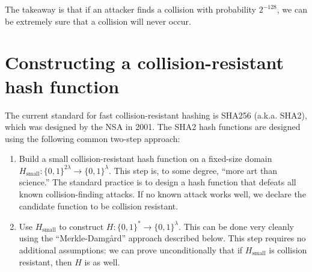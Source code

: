 \documentclass[
  letterpaper,
]{scrbook}
\newcommand{\zo}{\{0,1\}}
\newcommand{\bin}{\zo}
\theoremstyle{definition}
\theoremstyle{plain}
\theoremstyle{plain}
\theoremstyle{remark}
\begin{document}
The takeaway is that if an attacker finds a collision with probability
\(2^{-128}\), we can be extremely sure that a collision will never
occur.

\section{Constructing a collision-resistant hash
function}\label{constructing-a-collision-resistant-hash-function}

The current standard for fast collision-resistant hashing is SHA256
(a.k.a. SHA2), which was designed by the NSA in 2001. The SHA2 hash
functions are designed using the following common two-step approach:


\begin{enumerate}
\def\labelenumi{\arabic{enumi}.}
\item
  Build a small collision-resistant hash function on a fixed-size domain
  \(H_\text{small}: \bin^{2\lambda} \rightarrow \bin^\lambda\). This
  step is, to some degree, ``more art than science.'' The standard
  practice is to design a hash function that defeats all known
  collision-finding attacks. If no known attack works well, we declare
  the candidate function to be collision resistant.
\item
  Use \(H_{\text{small}}\) to construct
  \(H: \bin^* \rightarrow \bin^\lambda\). This can be done very cleanly
  using the ``Merkle-Damgård'' approach described below. This step
  requires no additional assumptions: we can prove unconditionally that
  if \(H_{\text{small}}\) is collision resistant, then \(H\) is as well.
\end{enumerate}

\end{document}

